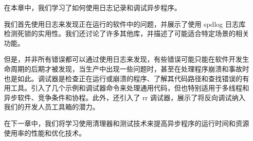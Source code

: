 在本章中，我们学习了如何使用日志记录和调试异步程序。

我们首先使用日志来发现正在运行的软件中的问题，并展示了使用 spdlog 日志库检测死锁的实用性。我们还讨论了许多其他库，并描述了可能适合特定场景的相关功能。

但是，并非所有错误都可以通过使用日志来发现，有些错误可能只能在软件开发生命周期的后期才被发现，当生产中出现一些问题时，甚至在处理程序崩溃和事故时也是如此。调试器是检查正在运行或崩溃的程序、了解其代码路径和查找错误的有用工具。引入了几个示例和调试器命令来处理通用代码，但也特别适用于多线程和异步软件、竞争条件和协程。此外，还引入了 rr 调试器，展示了将反向调试纳入我们的开发人员工具箱的潜力。

在下一章中，我们将学习使用清理器和测试技术来提高异步程序的运行时间和资源使用率的性能和优化技术。